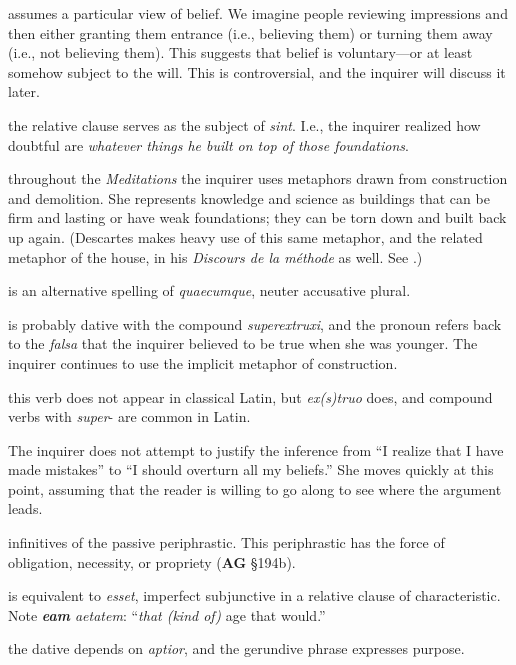  assumes a particular view of belief. We imagine people reviewing impressions and then either granting them entrance (i.e., believing them) or turning them away (i.e., not believing them). This suggests that belief is voluntary---or at least somehow subject to the will. This is controversial, and the inquirer will discuss it later.

 the relative clause serves as the subject of \textit{sint}. I.e., the inquirer realized how doubtful are \textit{whatever things he built on top of those foundations}.

 throughout the \textit{Meditations} the inquirer uses metaphors drawn from construction and demolition. She represents knowledge and science as buildings that can be firm and lasting or have weak foundations; they can be torn down and built back up again. (Descartes makes heavy use of this same metaphor, and the related metaphor of the house, in his \textit{Discours de la méthode} as well. See \cite[22]{curtis1984}.)

 is an alternative spelling of \textit{quaecumque}, neuter accusative plural.

 is probably dative with the compound \textit{superextruxi}, and the pronoun refers back to the \textit{falsa} that the inquirer believed to be true when she was younger. The inquirer continues to use the implicit metaphor of construction.

 this verb does not appear in classical Latin, but \textit{ex(s)truo} does, and compound verbs with \textit{super}- are common in Latin.

 The inquirer does not attempt to justify the inference from ``I realize that I have made mistakes'' to ``I should overturn all my beliefs.'' She moves quickly at this point, assuming that the reader is willing to go along to see where the argument leads. 

 infinitives of the passive periphrastic. This periphrastic has the force of obligation, necessity, or propriety (\textbf{AG} §194b).

 is equivalent to \textit{esset}, imperfect subjunctive in a relative clause of characteristic. Note \textit{\textbf{eam} aetatem}: ``\textit{that (kind of)} age that would.''

 the dative depends on \textit{aptior}, and the gerundive phrase expresses purpose.

